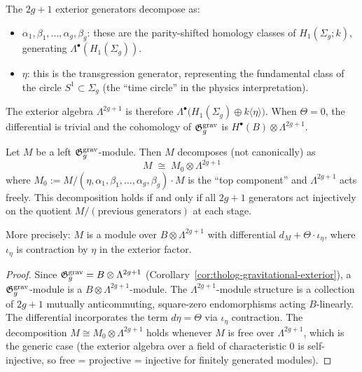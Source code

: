 \begin{remark}
The $2g + 1$ exterior generators decompose as:
\begin{itemize}
\item $\alpha_1, \beta_1, \dots, \alpha_g, \beta_g$: these
 are the parity-shifted homology classes of
 $H_1(\Sigma_g; k)$, generating $\Lambda^\bullet(H_1(\Sigma_g))$.
\item $\eta$: this is the transgression generator, representing
 the fundamental class of the circle
 $S^1 \subset \Sigma_g$ (the ``time circle'' in the
 physics interpretation).
\end{itemize}
The exterior algebra $\Lambda^{2g+1}$ is therefore
$\Lambda^\bullet\bigl(H_1(\Sigma_g) \oplus k\langle\eta\rangle\bigr)$.
When $\Theta = 0$, the differential is trivial and the
cohomology of $\mathfrak{G}_g^{\mathrm{grav}}$ is
$H^\bullet(B) \otimes \Lambda^{2g+1}$.
\end{remark}

\begin{proposition}
Let $M$ be a left $\mathfrak{G}_g^{\mathrm{grav}}$-module.
Then $M$ decomposes (not canonically) as
\[
M \;\cong\; M_0 \otimes \Lambda^{2g+1}
\]
where $M_0 := M / (\eta, \alpha_1, \beta_1, \dots, \alpha_g, \beta_g) \cdot M$
is the ``top component'' and $\Lambda^{2g+1}$ acts freely.
This decomposition holds if and only if all $2g + 1$ generators
act injectively on the quotient $M / (\text{previous generators})$
at each stage.

More precisely: $M$ is a module over $B \otimes \Lambda^{2g+1}$
with differential $d_M + \Theta \cdot \iota_\eta$,
where $\iota_\eta$ is contraction by $\eta$ in the exterior factor.
\end{proposition}

\begin{proof}
Since $\mathfrak{G}_g^{\mathrm{grav}} = B \otimes \Lambda^{2g+1}$
(Corollary~\ref{cor:tholog-gravitational-exterior}),
a $\mathfrak{G}_g^{\mathrm{grav}}$-module is a
$B \otimes \Lambda^{2g+1}$-module.
The $\Lambda^{2g+1}$-module structure is a collection of
$2g + 1$ mutually anticommuting, square-zero endomorphisms
acting $B$-linearly.
The differential incorporates the term $d\eta = \Theta$
via $\iota_\eta$ contraction.
The decomposition $M \cong M_0 \otimes \Lambda^{2g+1}$
holds whenever $M$ is free over $\Lambda^{2g+1}$,
which is the generic case (the exterior algebra over a field
of characteristic $0$ is self-injective, so free = projective
= injective for finitely generated modules).
\end{proof}

